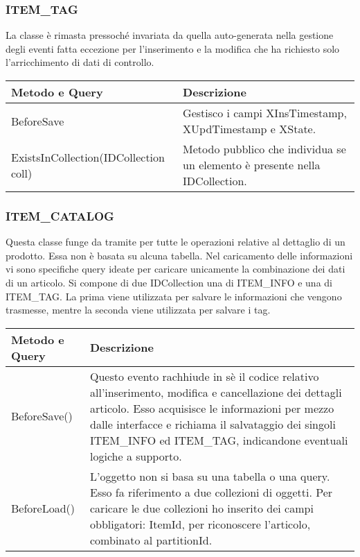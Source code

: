 \subsubsection{ITEM\_TAG}
La classe è rimasta pressoché invariata da quella auto-generata nella gestione degli eventi fatta eccezione per l'inserimento e la modifica che ha richiesto solo l'arricchimento di dati di controllo.

\begin{center}
	\begin{tabular}{ p{5cm}|p{} }
		\hline
		\textbf{Metodo e Query} & \textbf{Descrizione}\\
		\hline
		BeforeSave& Gestisco i campi XInsTimestamp, XUpdTimestamp e XState.\\
		\hline
		ExistsInCollection(IDCollection coll) & Metodo pubblico che individua se un elemento è presente nella IDCollection.\\
		
	\end{tabular}
\end{center}

\subsubsection{ITEM\_CATALOG}
Questa classe funge da tramite per tutte le operazioni relative al dettaglio di un prodotto. Essa non è basata su alcuna tabella. Nel caricamento delle informazioni vi sono specifiche query ideate per caricare unicamente la combinazione dei dati di un articolo. Si compone di due IDCollection una di ITEM\_INFO e una di ITEM\_TAG. La prima viene utilizzata per salvare le informazioni che vengono trasmesse, mentre la seconda viene utilizzata per salvare i tag.

\begin{center}
	\begin{tabular}{ p{3cm}|p{} }
		\hline
		\textbf{Metodo e Query} & \textbf{Descrizione}\\
		\hline
		BeforeSave()& Questo evento rachhiude in sè il codice relativo all'inserimento, modifica e cancellazione dei dettagli articolo. Esso acquisisce le informazioni per mezzo dalle interfacce e richiama il salvataggio dei singoli ITEM\_INFO ed ITEM\_TAG, indicandone eventuali logiche a supporto.\\
		BeforeLoad()& L'oggetto non si basa su una tabella o una query. Esso fa riferimento a due collezioni di oggetti. Per caricare le due collezioni ho inserito dei campi obbligatori: ItemId, per riconoscere l'articolo, combinato al partitionId.  \\
		
	\end{tabular}
\end{center}


